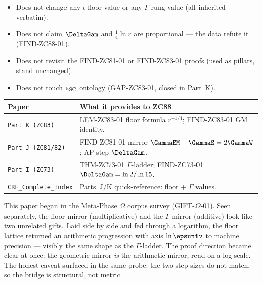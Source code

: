 \documentclass[12pt, a4paper]{article}
\renewcommand{\epsSC}{\varepsilon_{\rm SC}}     %
\begin{document}
\begin{keybox}[title={What ZC88 Does NOT Do}]
\begin{itemize}[leftmargin=2em, noitemsep]
  \item Does not change any $\epsilon$ floor value or any $\Gamma$ rung
    value (all inherited verbatim).
  \item Does not claim $\DeltaGam$ and $\tfrac14\ln r$ are proportional
    --- the data refute it (FIND-ZC88-01).
  \item Does not revisit the FIND-ZC81-01 or FIND-ZC83-01 proofs
    (used as pillars, stand unchanged).
  \item Does not touch $\epsSC$ ontology (GAP-ZC83-01, closed in Part~K).
\end{itemize}
\end{keybox}

\begin{keybox}[title={Companion Papers --- ZC88}]
{\small\renewcommand{\arraystretch}{1.25}
\begin{center}
\begin{tabular}{@{}p{5.2cm}p{7.3cm}@{}}
\toprule
\textbf{Paper} & \textbf{What it provides to ZC88} \\
\midrule
\texttt{Part~K (ZC83)}
  & LEM-ZC83-01 floor formula $r^{\pm1/4}$; FIND-ZC83-01 GM identity. \\
\texttt{Part~J (ZC81/82)}
  & FIND-ZC81-01 mirror $\GammaEM+\GammaS=2\GammaW$; AP step $\DeltaGam$. \\
\texttt{Part~I (ZC73)}
  & THM-ZC73-01 $\Gamma$-ladder; FIND-ZC73-01 $\DeltaGam=\ln2/\ln15$. \\
\texttt{CRF\_Complete\_Index}
  & Parts~J/K quick-reference: floor + $\Gamma$ values. \\
\bottomrule
\end{tabular}
\end{center}}
\end{keybox}

\begin{derivedbox}[title={Discovery Note}]
This paper began in the Meta-Phase $\Omega$ corpus survey (GIFT-$\Omega$-01).
Seen separately, the floor mirror (multiplicative) and the $\Gamma$ mirror
(additive) look like two unrelated gifts. Laid side by side and fed through
a logarithm, the floor lattice returned an arithmetic progression with axis
$\ln\epsuniv$ to machine precision --- visibly the same shape as the
$\Gamma$-ladder. The proof direction became clear at once: the geometric
mirror \emph{is} the arithmetic mirror, read on a log scale. The honest
caveat surfaced in the same probe: the two step-sizes do not match, so the
bridge is structural, not metric.
\end{derivedbox}
\end{document}
